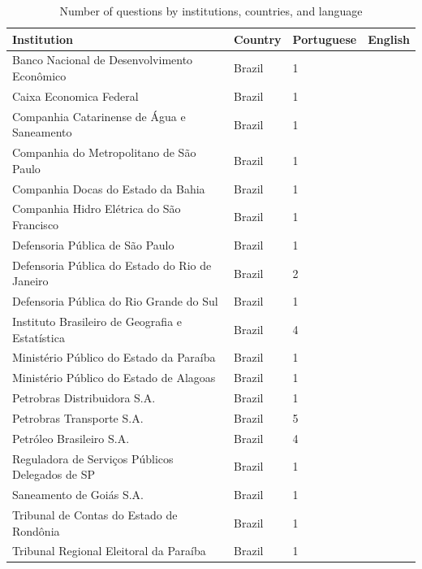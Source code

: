 \begin{table}[!ht]
    \small
    \centering
    \caption{Number of questions by institutions, countries, and language}
    \label{table:instituttion}
    \begin{tabular}{llll}
        \toprule
        \hline
        \rowcolor{gray!19} \textbf{Institution} & \textbf{Country} & \textbf{Portuguese} & \textbf{English} \\ \hline
        Banco Nacional de Desenvolvimento Econômico & Brazil & 1 & ~ \\
        \rowcolor{gray!19} Caixa Economica Federal & Brazil & 1 & ~ \\ 
        Companhia Catarinense de Água e Saneamento & Brazil & 1 & ~ \\
        \rowcolor{gray!19} Companhia do Metropolitano de São Paulo & Brazil & 1 & ~ \\ 
        Companhia Docas do Estado da Bahia & Brazil & 1 & ~ \\ 
        \rowcolor{gray!19} Companhia Hidro Elétrica do São Francisco & Brazil & 1 & ~ \\ 
        Defensoria Pública de São Paulo & Brazil & 1 & ~ \\ 
        \rowcolor{gray!19} Defensoria Pública do Estado do Rio de Janeiro & Brazil & 2 & ~ \\ 
        Defensoria Pública do Rio Grande do Sul & Brazil & 1 & ~ \\ 
        \rowcolor{gray!19} Instituto Brasileiro de Geografia e Estatística & Brazil & 4 & ~ \\ 
        Ministério Público do Estado da Paraíba & Brazil & 1 & ~ \\ 
        \rowcolor{gray!19} Ministério Público do Estado de Alagoas & Brazil & 1 & ~ \\ 
        Petrobras Distribuidora S.A. & Brazil & 1 & ~ \\ 
        \rowcolor{gray!19} Petrobras Transporte S.A. & Brazil & 5 & ~ \\ 
        Petróleo Brasileiro S.A. & Brazil & 4 & ~ \\ 
        \rowcolor{gray!19} Reguladora de Serviços Públicos Delegados de SP & Brazil & 1 & ~ \\ 
        Saneamento de Goiás S.A. & Brazil & 1 & ~ \\ 
        \rowcolor{gray!19} Tribunal de Contas do Estado de Rondônia & Brazil & 1 & ~ \\ 
        Tribunal Regional Eleitoral da Paraíba & Brazil & 1 & ~ \\ 

\end{tabular}
\end{table}
